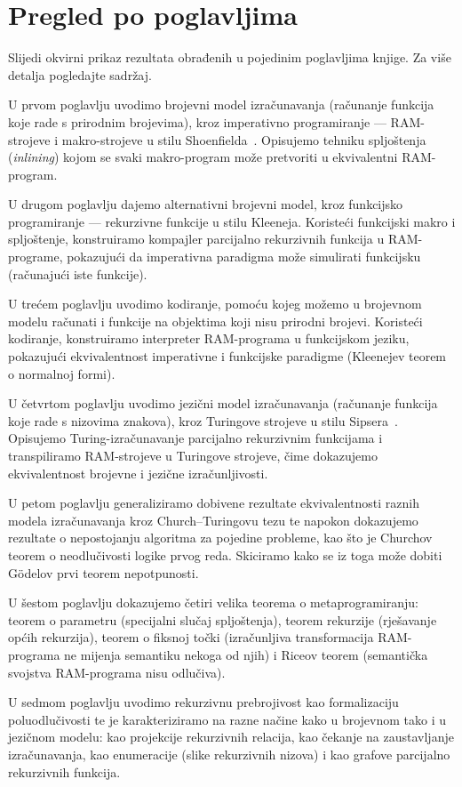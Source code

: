 \section{Pregled po poglavljima}
Slijedi okvirni prikaz rezultata obrađenih u pojedinim poglavljima knjige. Za više detalja pogledajte sadržaj.

U prvom poglavlju uvodimo brojevni model izračunavanja (računanje funkcija koje rade s prirodnim brojevima), kroz imperativno programiranje --- RAM-strojeve i makro-strojeve u stilu Shoenfielda~\cite{shoenfield}. Opisujemo tehniku spljoštenja (\emph{inlining}) kojom se svaki makro-program može pretvoriti u ekvivalentni RAM-program.

U drugom poglavlju dajemo alternativni brojevni model, kroz funkcijsko programiranje --- rekurzivne funkcije u stilu Kleeneja. Koristeći funkcijski makro i spljoštenje, konstruiramo kompajler parcijalno rekurzivnih funkcija u RAM-programe, pokazujući da imperativna paradigma može simulirati funkcijsku (računajući iste funkcije).

U trećem poglavlju uvodimo kodiranje, pomoću kojeg možemo u brojevnom modelu računati i funkcije na objektima koji nisu prirodni brojevi. Koristeći kodiranje, konstruiramo interpreter RAM-programa u funkcijskom jeziku, pokazujući ekvivalentnost imperativne i funkcijske paradigme (Kleenejev teorem o normalnoj formi).

U četvrtom poglavlju uvodimo jezični model izračunavanja (računanje funkcija koje rade s nizovima znakova), kroz Turingove strojeve u stilu Sipsera~\cite{sipser}. Opisujemo Turing-izračunavanje parcijalno rekurzivnim funkcijama i transpiliramo RAM-strojeve u Turingove strojeve, čime dokazujemo ekvivalentnost brojevne i jezične izračunljivosti.

U petom poglavlju generaliziramo dobivene rezultate ekvivalentnosti raznih modela izračunavanja kroz Church--\!Turingovu tezu te napokon dokazujemo rezultate o nepostojanju algoritma za pojedine probleme, kao što je Churchov teorem o neodlučivosti logike prvog reda. Skiciramo kako se iz toga može dobiti G\"odelov prvi teorem nepotpunosti.

U šestom poglavlju dokazujemo četiri velika teorema o metaprogramiranju: teorem o parametru (specijalni slučaj spljoštenja), teorem rekurzije (rješavanje općih rekurzija), teorem o fiksnoj točki (izračunljiva transformacija RAM-programa ne mijenja semantiku nekoga od njih) i Riceov teorem (semantička svojstva RAM-programa nisu odlučiva).

U sedmom poglavlju uvodimo rekurzivnu prebrojivost kao formalizaciju poluodlučivosti te je karakteriziramo na razne načine kako u brojevnom tako i u jezičnom modelu: kao projekcije rekurzivnih relacija, kao čekanje na zaustavljanje izračunavanja, kao enumeracije (slike rekurzivnih nizova) i kao grafove parcijalno rekurzivnih funkcija.
